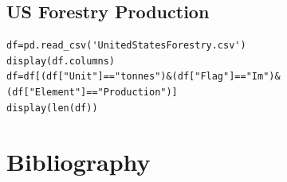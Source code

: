 \documentclass[11pt]{article}
\numberwithin{equation}{section}
\begin{document}
\subsection{US Forestry Production}
\label{sec:org1e2a3be}
\begin{verbatim}
df=pd.read_csv('UnitedStatesForestry.csv')
display(df.columns)
df=df[(df["Unit"]=="tonnes")&(df["Flag"]=="Im")&(df["Element"]=="Production")]
display(len(df))
\end{verbatim}

\section{Bibliography}
\label{sec:org0f130b8}


\end{document}
